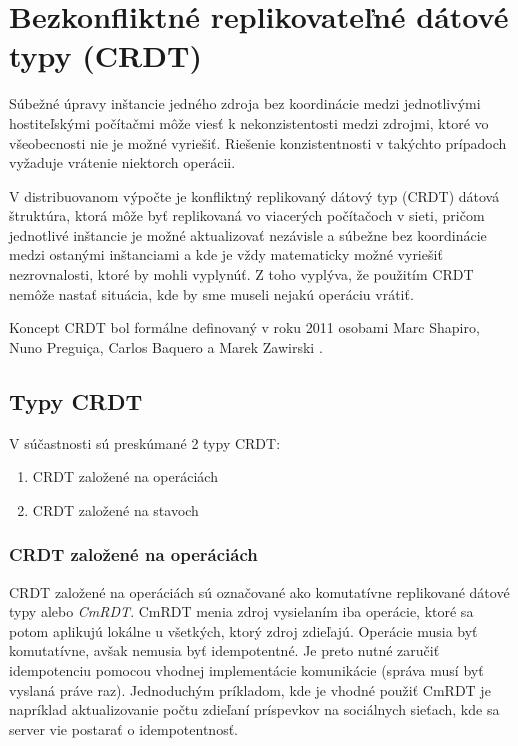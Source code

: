 \chapter{Bezkonfliktné replikovateľné dátové typy (CRDT)}

\label{kap:cdrt} %


Súbežné úpravy inštancie jedného zdroja bez koordinácie medzi jednotlivými hostiteľskými
počítačmi môže viesť k nekonzistentosti medzi zdrojmi, ktoré vo všeobecnosti nie je možné
vyriešiť. Riešenie konzistentnosti v takýchto prípadoch vyžaduje vrátenie niektorch operácii.

V distribuovanom výpočte je konfliktný replikovaný dátový typ (CRDT) dátová štruktúra,
ktorá môže byť replikovaná vo viacerých počítačoch v sieti, pričom jednotlivé inštancie je možné
aktualizovať nezávisle a súbežne bez koordinácie medzi ostanými inštanciami a kde je vždy
matematicky možné vyriešiť nezrovnalosti, ktoré by mohli vyplynúť. Z toho vyplýva, že použitím
CRDT nemôže nastať situácia, kde by sme museli nejakú operáciu vrátiť. 

Koncept CRDT bol formálne definovaný v roku 2011 osobami
Marc Shapiro, Nuno Preguiça, Carlos Baquero a Marek Zawirski \cite{crdt_definition}.

\section{Typy CRDT}
V súčastnosti sú preskúmané 2 typy CRDT:
\begin{enumerate}
  \item CRDT založené na operáciách
  \item CRDT založené na stavoch
\end{enumerate}

\subsection{CRDT založené na operáciách}
CRDT založené na operáciách sú označované ako komutatívne replikované dátové typy alebo 
\textit{CmRDT}. CmRDT menia zdroj vysielaním iba operácie, ktoré sa potom aplikujú lokálne
u všetkých, ktorý zdroj zdieľajú. Operácie musia byť komutatívne, avšak nemusia 
byť idempotentné. Je preto nutné zaručiť idempotenciu pomocou vhodnej implementácie
komunikácie (správa musí byť vyslaná práve raz). 
Jednoduchým príkladom, kde je vhodné použiť CmRDT je napríklad aktualizovanie počtu zdieľaní
príspevkov na sociálnych sieťach, kde sa server vie postarať o idempotentnosť. 

